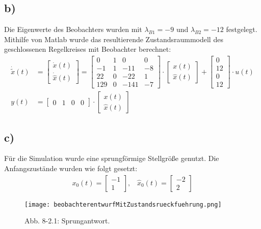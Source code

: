 \documentclass[11pt]{scrartcl} %
\begin{document}
\subsection*{b)}
Die Eigenwerte des Beobachters wurden mit $\lambda_{B1}=-9$ und $\lambda_{B2}=-12$ festgelegt.\\
Mithilfe von Matlab wurde das resultierende Zustandsraummodell des geschlossenen Regelkreises mit Beobachter berechnet:
\begin{align*}
	\dot{\tilde{x}}(t)&=\begin{bmatrix}\dot{x}(t)\\\dot{\hat{x}}(t)\end{bmatrix}=\begin{bmatrix}0&1&0&0\\-1&1&-11&-8\\22&0&-22&1\\129&0&-141&-7\end{bmatrix}\cdot\begin{bmatrix}x(t)\\\hat{x}(t)\end{bmatrix}+\begin{bmatrix}0\\12\\0\\12\end{bmatrix}\cdot u(t)\\
	y(t)&=\begin{bmatrix}0&1&0&0\end{bmatrix}\cdot\begin{bmatrix}x(t)\\\hat{x}(t)\end{bmatrix}
\end{align*}
\subsection*{c)}
Für die Simulation wurde eine sprungförmige Stellgröße genutzt. Die Anfangszustände wurden wie folgt gesetzt:
\begin{align*}
	x_0(t)=\begin{bmatrix}-1\\1\end{bmatrix},\hspace{10pt}\hat{x}_0(t)=\begin{bmatrix}-2\\2\end{bmatrix}
\end{align*}
\begin{figure}[H]
\centering
\texttt{[image: beobachterentwurfMitZustandsrueckfuehrung.png]}
\captionsetup{labelformat=empty}
\caption{Abb. 8-2.1: Sprungantwort.}
\end{figure}
\end{document}
